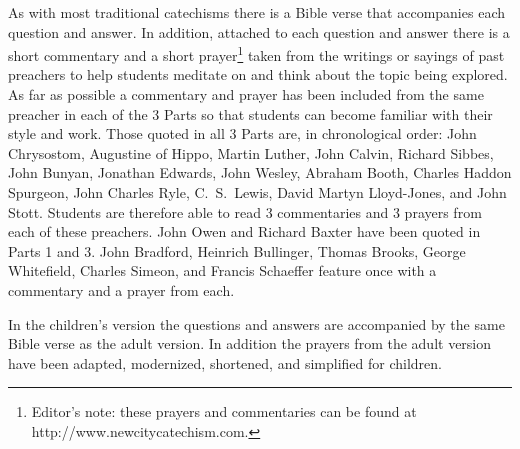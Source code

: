 \documentclass[titlepage]{memoir}
\begin{document}
As with most traditional catechisms there is a Bible verse that accompanies each question and answer. In addition, attached to each question and answer there is a short commentary and a short prayer\footnote{Editor's note: these prayers and commentaries can be found at http:/\slash{}www.new\hspace{0em}city\hspace{0em}cate\hspace{0em}chism.\hspace{0em}com.} taken from the writings or sayings of past preachers to help students meditate on and think about the topic being explored. As far as possible a commentary and prayer has been included from the same preacher in each of the 3 Parts so that students can become familiar with their style and work. Those quoted in all 3 Parts are, in chronological order: John Chrysostom, Augustine of Hippo, Martin Luther, John Calvin, Richard Sibbes, John Bunyan, Jonathan Edwards, John Wesley, Abraham Booth, Charles Haddon Spurgeon, John Charles Ryle, C.~S.\ Lewis, David Martyn Lloyd-Jones, and John Stott. Students are therefore able to read 3 commentaries and 3 prayers from each of these preachers. John Owen and Richard Baxter have been quoted in Parts 1 and 3. John Bradford, Heinrich Bullinger, Thomas Brooks, George Whitefield, Charles Simeon, and Francis Schaeffer feature once with a commentary and a prayer from each.

In the children's version the questions and answers are accompanied by the same Bible verse as the adult version. In addition the prayers from the adult version have been adapted, modernized, shortened, and simplified for children.
\end{document}
